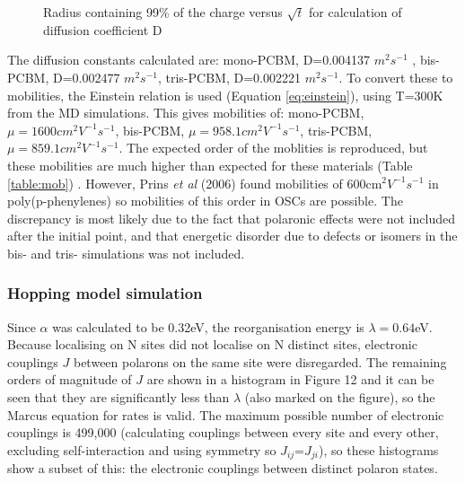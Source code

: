\documentclass[a4paper,12pt]{article}
\begin{document}
\begin{figure}[H]
\centering
{}
\caption{Radius containing 99\% of the charge versus $\sqrt{t}$ for calculation of diffusion coefficient D}
\label{fig:diffusion}
\end{figure}

\noindent The diffusion constants calculated are: mono-PCBM, D=0.004137 $m^2s^{-1}$ , bis-PCBM, D=0.002477 $m^2s^{-1}$, tris-PCBM, D=0.002221 $m^2s^{-1}$. To convert these to mobilities, the Einstein relation is used (Equation \ref{eq:einstein}), using T=300K from the MD simulations. This gives mobilities of: mono-PCBM, $\mu=1600 cm^2V^{-1}s^{-1}$, bis-PCBM, $\mu=958.1 cm^2V^{-1}s^{-1}$, tris-PCBM, $\mu=859.1 cm^2V^{-1}s^{-1}$. The expected order of the moblities is reproduced, but these mobilities are much higher than expected for these materials (Table \ref{table:mob}) \cite{Steinera}. However, Prins \textit{et al} (2006) found mobilities of 600cm$^2V^{-1}s^{-1}$ in poly(p-phenylenes) \cite{Prins2006} so mobilities of this order in OSCs are possible. The discrepancy is most likely due to the fact that polaronic effects were not included after the initial point, and that energetic disorder due to defects or isomers in the bis- and tris- simulations was not included. 

\subsubsection{Hopping model simulation}

\noindent Since $\alpha$ was calculated to be 0.32eV, the reorganisation energy is $\lambda = 0.64$eV. Because localising on N sites did not localise on N distinct sites, electronic couplings $J$ between polarons on the same site were disregarded. The remaining orders of magnitude of $J$ are shown in a histogram in Figure 12 and it can be seen that they are  significantly less than $\lambda$ (also marked on the figure), so the Marcus equation for rates is valid. The maximum possible number of electronic couplings is 499,000 (calculating couplings between every site and every other, excluding self-interaction and using symmetry so $J_{ij}$=$J_{ji}$), so these histograms show a subset of this: the electronic couplings between distinct polaron states. \\ 
\end{document}
